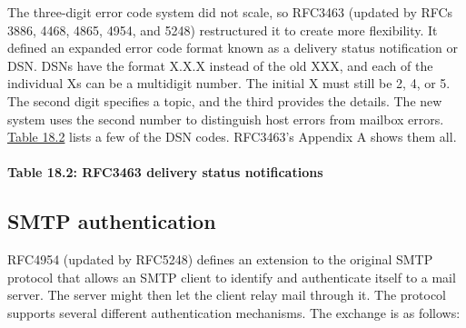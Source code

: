 The three-digit error code system did not scale, so RFC3463 (updated by
RFCs 3886, 4468, 4865, 4954, and 5248) restructured it to create more
flexibility. It defined an expanded error code format known as a
delivery status notification or DSN. DSNs have the format X.X.X instead
of the old XXX, and each of the individual Xs can be a multidigit
number. The initial X must still be 2, 4, or 5. The second digit
specifies a topic, and the third provides the details. The new system
uses the second number to distinguish host errors from mailbox errors.
\protect\hyperlink{part0026_split_011.htmlux5cux23_idTextAnchor1016}{Table
18.2} lists a few of the DSN codes. RFC3463's Appendix A shows them all.

\paragraph[{Table 18.2: }RFC3463 delivery status
notifications]{\texorpdfstring{{Table 18.2:
}\protect\hypertarget{part0026_split_011.htmlux5cux23_idIndexMarker2435}{}{}\protect\hypertarget{part0026_split_011.htmlux5cux23_idTextAnchor1016}{}{}\protect\hypertarget{part0026_split_011.htmlux5cux23_idTextAnchor1017}{}{}RFC3463
delivery status
notifications}{Table 18.2: RFC3463 delivery status notifications}}


\protect\hypertarget{part0026_split_012.html}{}{}

\hypertarget{part0026_split_012.htmlux5cux23_idContainer1247}{}
\hypertarget{part0026_split_012.htmlux5cux23calibre_pb_11}{%
\subsection[SMTP
authentication]{\texorpdfstring{\protect\hypertarget{part0026_split_012.htmlux5cux23_idTextAnchor1018}{}{}SMTP
authentication}{SMTP authentication}}\label{part0026_split_012.htmlux5cux23calibre_pb_11}}

\protect\hypertarget{part0026_split_012.htmlux5cux23_idIndexMarker2436}{}{}RFC4954
(updated by RFC5248) defines an extension to the original SMTP protocol
that allows an SMTP client to identify and
\protect\hypertarget{part0026_split_012.htmlux5cux23_idIndexMarker2437}{}{}\protect\hypertarget{part0026_split_012.htmlux5cux23_idIndexMarker2438}{}{}\protect\hypertarget{part0026_split_012.htmlux5cux23_idIndexMarker2439}{}{}\protect\hypertarget{part0026_split_012.htmlux5cux23_idIndexMarker2440}{}{}\protect\hypertarget{part0026_split_012.htmlux5cux23_idIndexMarker2441}{}{}authenticate
itself to a mail server. The server might then let the client relay mail
through it. The protocol supports several different authentication
mechanisms. The exchange is as follows:

